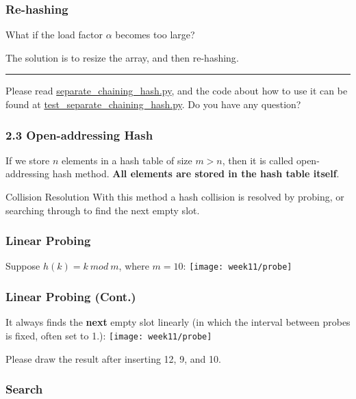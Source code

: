 \documentclass[aspectratio=169, 14pt]{beamer}
\begin{document}
\begin{frame}
	\frametitle{Re-hashing}
	 What if the load factor $\alpha$ becomes too large?

	The solution is to resize the array, and then \alert{re-hashing}.

	\par\noindent\rule{\textwidth}{0.4pt}

	 Please read \href{https://github.com/ChenZhongPu/data-structure-swufe/blob/master/code/python/hash/separate_chaining_hash.py}{separate\_chaining\_hash.py}, and the code about how to use it can be found at \href{https://github.com/ChenZhongPu/data-structure-swufe/blob/master/code/python/hash/test_separate_chaining_hash.py}{test\_separate\_chaining\_hash.py}. Do you have any question?

\end{frame}

\begin{frame}
	\frametitle{2.3 Open-addressing Hash}
	If we store $n$ elements in a hash table of size $m > n$, then it is called \alert{open-addressing} hash method. \textbf{All elements are stored in the hash table itself}.

	\begin{block}{Collision Resolution}
		With this method a hash collision is resolved by \alert{probing}, or searching through to find the next empty slot.
	\end{block}

\end{frame}

\begin{frame}
	\frametitle{Linear Probing}
	Suppose $h(k) = k \ mod \ m$, where $m = 10$:
	\texttt{[image: week11/probe]}

\end{frame}

\begin{frame}
	\frametitle{Linear Probing (Cont.)}
	It always finds the \textbf{next} empty slot \alert{linearly} (in which the interval between probes is fixed, often set to 1.):
	\texttt{[image: week11/probe]}

	 Please draw the result after inserting 12, 9, and 10.
\end{frame}

\begin{frame}[fragile]
	\frametitle{Search}


\end{frame}
\end{document}
